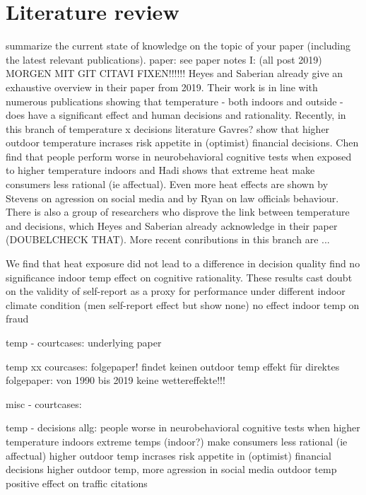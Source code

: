 \documentclass[11pt]{article}
\begin{document}
	\section{Literature review}
	summarize the current state of knowledge on the topic of your paper
	(including the latest relevant publications).
	paper: see paper notes 
	I: (all post 2019) 
	MORGEN MIT GIT CITAVI FIXEN!!!!!!\newline
	Heyes and Saberian already give an exhaustive overview in their paper from 2019. Their work is in line with numerous publications showing that temperature - both indoors and outside - does have a significant effect and human decisions and rationality. Recently, in this branch of temperature x decisions literature Gavres? \cite{Gavresi.2021} show that higher outdoor temperature incrases risk appetite in (optimist) financial decisions. Chen \cite{Chen.2020} find that people perform worse in neurobehavioral cognitive tests when exposed to higher temperature indoors and Hadi \cite{Hadi.2019} shows that extreme heat make consumers less rational (ie affectual). Even more heat effects are shown by Stevens \cite{Stevens.2021} on agression on social media and by Ryan \cite{Ryan.2020} on law officials behaviour. \newline
	There is also a group of researchers who disprove the link between temperature and decisions, which Heyes and Saberian already acknowledge in their paper (DOUBELCHECK THAT). More recent conributions in this branch are ...
	
	\cite{Stroom.2021} We find that heat exposure did not lead to  a difference in decision quality
	\cite{Stroom.2021} find no significance indoor temp effect on cognitive rationality.  These results cast doubt on the validity of self-report as a proxy for performance under different indoor climate condition (men self-report effect but show none) 
	\cite{Liu.2020} no effect indoor temp on fraud 
	
	
	temp - courtcases:
	\cite{Heyes.2019} underlying paper
	
	temp xx courcases:
	\cite{Evans.2021} folgepaper! findet keinen outdoor temp effekt für
	\cite{Spamann.2020} \newline direktes folgepaper: von 1990 bis 2019 keine wettereffekte!!!
	
	misc - courtcases:
	
	temp - decisions allg: 
	\cite{Chen.2020} people worse in neurobehavioral cognitive tests when higher temperature indoors
	\cite{Hadi.2019} extreme temps (indoor?) make consumers less rational (ie affectual) 
	\cite{Gavresi.2021} higher outdoor temp incrases risk appetite in (optimist) financial decisions 
	\cite{Stevens.2021} higher outdoor temp, more agression in social media 
	\cite{Ryan.2020} outdoor temp positive effect on traffic citations
	
\end{document}
